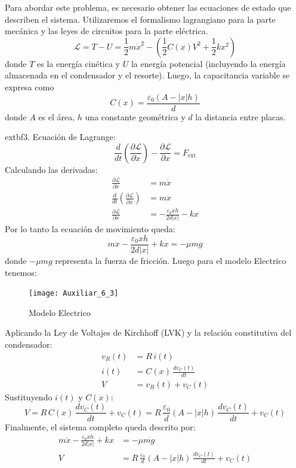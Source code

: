 \documentclass[
  11pt,
  letterpaper,
   addpoints,
  answers
  ]{exam}
\begin{document}
\begin{questions}
\begin{solution}
Para abordar este problema, es necesario obtener las ecuaciones de estado que describen el sistema. Utilizaremos el formalismo lagrangiano para la parte mecánica y las leyes de circuitos para la parte eléctrica.
\begin{equation}
\mathcal{L} = T - U = \frac{1}{2}m\dot{x}^2 - \left( \frac{1}{2}C(x)V^2 + \frac{1}{2}k x^2 \right)
\end{equation}
donde $T$ es la energía cinética y $U$ la energía potencial (incluyendo la energía almacenada en el condensador y el resorte). Luego, la capacitancia variable se expresa como
\begin{equation}
C(x) = \frac{\varepsilon_0 (A - |x| h)}{d}
\end{equation}
donde $A$ es el área, $h$ una constante geométrica y $d$ la distancia entre placas.

	extbf{3. Ecuación de Lagrange:}
\begin{equation}
\frac{d}{dt}\left( \frac{\partial \mathcal{L}}{\partial \dot{x}} \right) - \frac{\partial \mathcal{L}}{\partial x} = F_{\text{ext}}
\end{equation}
Calculando las derivadas:
\begin{align}
\frac{\partial \mathcal{L}}{\partial \dot{x}} &= m\dot{x} \\
\frac{d}{dt}\left( \frac{\partial \mathcal{L}}{\partial \dot{x}} \right) &= m\ddot{x} \\
\frac{\partial \mathcal{L}}{\partial x} &= -\frac{\varepsilon_0 x h}{2d|x|} - kx
\end{align}
Por lo tanto la ecuación de movimiento queda:
\begin{equation}
m\ddot{x} - \frac{\varepsilon_0 x h}{2d|x|} + kx = -\mu m g
\end{equation}
donde $-\mu m g$ representa la fuerza de fricción. Luego para el modelo Electrico tenemos:
\begin{figure}[H]
    \centering
    \texttt{[image: Auxiliar\_6\_3]}
    \caption{Modelo Electrico}
\end{figure}
Aplicando la Ley de Voltajes de Kirchhoff (LVK) y la relación constitutiva del condensador:
\begin{align}
v_R(t) &= R\,i(t) \\
i(t) &= C(x)\,\frac{dv_C(t)}{dt} \\
V &= v_R(t) + v_C(t)
\end{align}
Sustituyendo $i(t)$ y $C(x)$:
\begin{equation}
V = R\,C(x)\,\frac{dv_C(t)}{dt} + v_C(t) = R\,\frac{\varepsilon_0}{d}(A - |x| h)\,\frac{dv_C(t)}{dt} + v_C(t)
\end{equation}
Finalmente, el sistema completo queda descrito por:
\begin{align}
m\ddot{x} - \frac{\varepsilon_0 x h}{2d|x|} + kx &= -\mu m g \\
V &= R\,\frac{\varepsilon_0}{d}(A - |x| h)\,\frac{dv_C(t)}{dt} + v_C(t)
\end{align}


\end{solution}
\end{questions}
\end{document}
